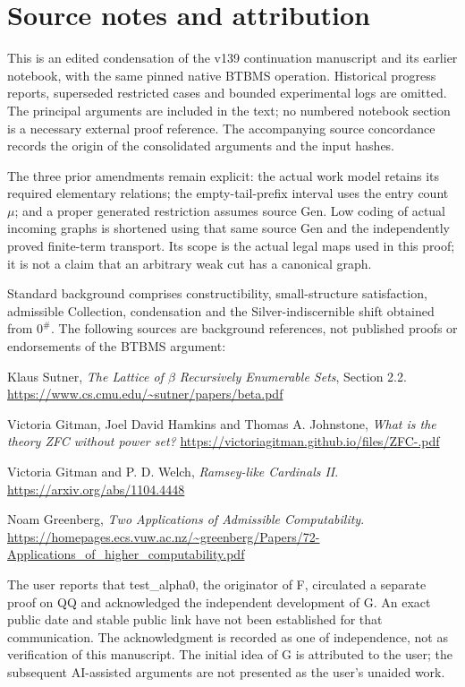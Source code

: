 \section*{Source notes and attribution}
This is an edited condensation of the v139 continuation manuscript and
its earlier notebook, with the same pinned native BTBMS operation.
Historical progress reports, superseded restricted cases and bounded
experimental logs are omitted. The principal arguments are included
in the text; no numbered notebook section is a necessary external
proof reference. The accompanying source concordance records the
origin of the consolidated arguments and the input hashes.

The three prior amendments remain explicit: the actual work model
retains its required elementary relations; the empty-tail-prefix
interval uses the entry count $\mu$; and a proper generated restriction
assumes source Gen. Low coding of actual incoming graphs is shortened
using that same source Gen and the independently proved finite-term
transport. Its scope is the actual legal maps used in this proof;
it is not a claim that an arbitrary weak cut has a canonical graph.

Standard background comprises constructibility, small-structure
satisfaction, admissible Collection, condensation and the
Silver-indiscernible shift obtained from $0^\#$. The following sources
are background references, not published proofs or endorsements of
the BTBMS argument:
\begin{enumerate}[label={[\arabic*]}]
\item Klaus Sutner, \emph{The Lattice of $\beta$ Recursively Enumerable
Sets}, Section 2.2. \url{https://www.cs.cmu.edu/~sutner/papers/beta.pdf}
\item Victoria Gitman, Joel David Hamkins and Thomas A. Johnstone,
\emph{What is the theory ZFC without power set?}
\url{https://victoriagitman.github.io/files/ZFC-.pdf}
\item Victoria Gitman and P. D. Welch, \emph{Ramsey-like Cardinals II}.
\url{https://arxiv.org/abs/1104.4448}
\item Noam Greenberg, \emph{Two Applications of Admissible Computability}.
\url{https://homepages.ecs.vuw.ac.nz/~greenberg/Papers/72-Applications_of_higher_computability.pdf}
\end{enumerate}

The user reports that test\_alpha0, the originator of F, circulated a separate proof
on QQ and acknowledged the independent development of G. An exact
public date and stable public link have not been established for that
communication. The acknowledgment is recorded as one of independence,
not as verification of this manuscript. The initial idea of G is
attributed to the user; the subsequent AI-assisted arguments are not
presented as the user's unaided work.
